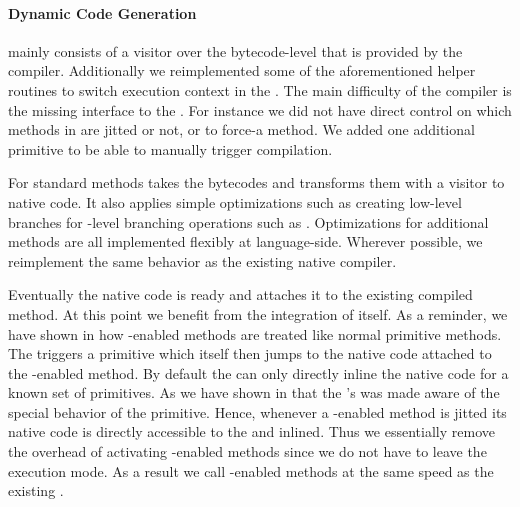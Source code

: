 \paragraph{\NBJ Dynamic Code Generation}
\NB mainly consists of a visitor over the bytecode-level \IR that is provided by the \PH compiler.
Additionally we reimplemented some of the aforementioned helper routines to switch execution context in the \VM.
The main difficulty of the \NBJ compiler is the missing interface to the \JIT.
For instance we did not have direct control on which methods in \PH are jitted or not, or to force-\JIT a method.
We added one additional primitive to be able to manually trigger \JIT compilation.

For standard methods \NBJ takes the bytecodes and transforms them with a visitor to native code.
It also applies simple optimizations such as creating low-level branches for \PH-level branching operations such as .
Optimizations for additional methods are all implemented flexibly at language-side.
Wherever possible, we reimplement the same behavior as the existing native \JIT compiler.

Eventually the native code is ready and \B attaches it to the existing compiled method.
At this point we benefit from the \JIT integration of \B itself.
As a reminder, we have shown in  how \B-enabled methods are treated like normal primitive methods.
The \VM triggers a \B primitive which itself then jumps to the native code attached to the \B-enabled method.
By default the \Cog \JIT can only directly inline the native code for a known set of primitives.
As we have shown in  that the \Cog's \JIT was made aware of the special behavior of the \B primitive.
Hence, whenever a \B-enabled method is jitted its native code is directly accessible to the \JIT and inlined.
Thus we essentially remove the overhead of activating \B-enabled methods since we do not have to leave the \JIT execution mode.
As a result we call \B-enabled methods at the same speed as the existing \JIT.


